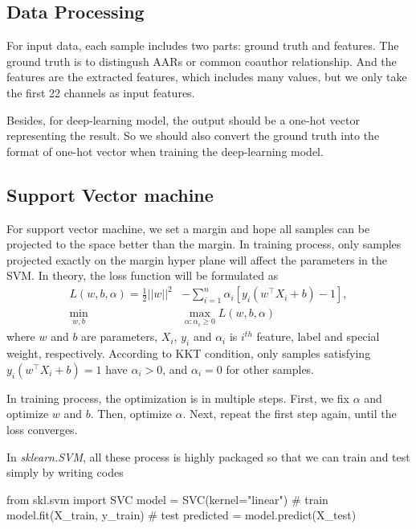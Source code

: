 \documentclass{article}
\begin{document}
\subsection{Data Processing}
For input data, each sample includes two parts: ground truth and features. The ground truth is to distingush AARs or common coauthor relationship. And the features are the extracted features, which includes many values, but we only take the first 22 channels as input features.

Besides, for deep-learning model, the output should be a one-hot vector representing the result. So we should also convert the ground truth into the format of one-hot vector when training the deep-learning model.

\subsection{Support Vector machine}
For support vector machine, we set a margin and hope all samples can be projected to the space better than the margin. In training process, only samples projected exactly on the margin hyper plane will affect the parameters in the SVM. In theory, the loss function will be formulated as
\begin{equation}
\begin{aligned}
     L(w,b,\alpha)=\frac{1}{2}||w||^2&-\sum_{i=1}^n \alpha_i\left[y_i(w^\top X_i+b)-1\right], \\
     \min_{w,b} &\max_{\alpha:\alpha_i\ge 0}L(w,b,\alpha)
\end{aligned}
\end{equation}
where $w$ and $b$ are parameters, $X_i$, $y_i$ and $\alpha_i$ is $i^{th}$ feature, label and special weight, respectively. According to KKT condition, only samples satisfying $y_i(w^\top X_i+b)=1$ have $\alpha_i>0$, and $\alpha_i=0$ for other samples.

In training process, the optimization is in multiple steps. First, we fix $\alpha$ and optimize $w$ and $b$. Then, optimize $\alpha$. Next, repeat the first step again, until the loss converges.

In \textit{sklearn.SVM}, all these process is highly packaged so that we can train and test simply by writing codes
\begin{python}
     from skl.svm import SVC
     model =  SVC(kernel="linear")
     # train
     model.fit(X_train, y_train)
     # test
     predicted =  model.predict(X_test)
\end{python}
\end{document}
